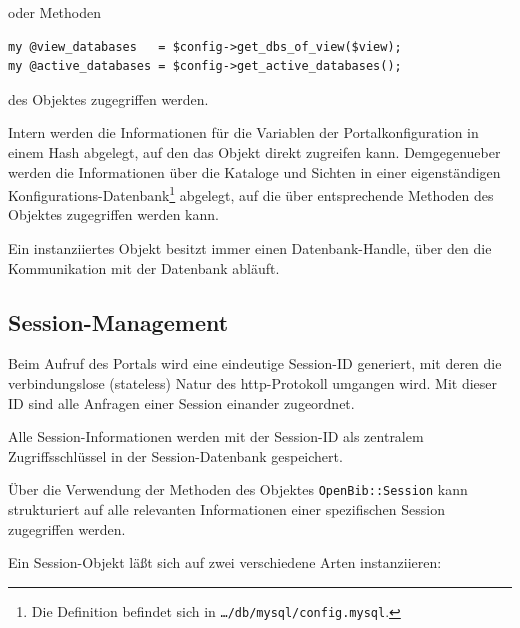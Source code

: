 \documentclass[11pt, twoside, a4paper, BCOR8mm, DIV12, bibtotoc,idxtotoc]{scrbook}
\begin{document}
oder Methoden

\begin{verbatim}
my @view_databases   = $config->get_dbs_of_view($view);
my @active_databases = $config->get_active_databases();
\end{verbatim}

des Objektes zugegriffen werden.

Intern werden die Informationen für die Variablen der
Portalkonfiguration in einem Hash abgelegt, auf den das Objekt direkt
zugreifen kann. Demgegenueber werden die Informationen über die
Kataloge und Sichten in einer eigenständigen
Konfigurations-Datenbank\footnote{Die Definition befindet sich in
  \texttt{\dots/db/mysql/config.mysql}.} abgelegt, auf die über
entsprechende Methoden des Objektes zugegriffen werden kann.

Ein instanziiertes Objekt besitzt immer einen Datenbank-Handle, über
den die Kommunikation mit der Datenbank abläuft.

\subsection{Session-Management}

Beim Aufruf des Portals wird eine eindeutige Session-ID generiert,
mit deren die verbindungslose (stateless) Natur des http-Protokoll
umgangen wird. Mit dieser ID sind alle Anfragen einer Session einander
zugeordnet.

Alle Session-Informationen werden mit der Session-ID als zentralem
Zugriffsschlüssel in der Session-Datenbank gespeichert.

Über die Verwendung der Methoden des Objektes
\texttt{OpenBib::Session} kann strukturiert auf alle relevanten
Informationen einer spezifischen Session zugegriffen werden.

Ein Session-Objekt läßt sich auf zwei verschiedene Arten
instanziieren:
\end{document}
